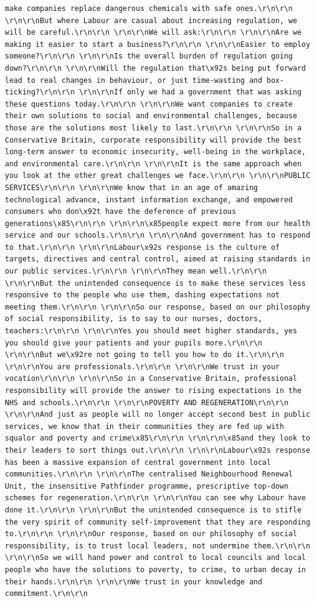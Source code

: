 \documentclass[
  letterpaper,
  DIV=11,
  numbers=noendperiod]{scrreprt}
\begin{document}
\begin{verbatim}
make companies replace dangerous chemicals with safe ones.\r\n\r\n \r\n\r\nBut where Labour are casual about increasing regulation, we will be careful.\r\n\r\n \r\n\r\nWe will ask:\r\n\r\n \r\n\r\nAre we making it easier to start a business?\r\n\r\n \r\n\r\nEasier to employ someone?\r\n\r\n \r\n\r\nIs the overall burden of regulation going down?\r\n\r\n \r\n\r\nWill the regulation that\x92s being put forward lead to real changes in behaviour, or just time-wasting and box-ticking?\r\n\r\n \r\n\r\nIf only we had a government that was asking these questions today.\r\n\r\n \r\n\r\nWe want companies to create their own solutions to social and environmental challenges, because those are the solutions most likely to last.\r\n\r\n \r\n\r\nSo in a Conservative Britain, corporate responsibility will provide the best long-term answer to economic insecurity, well-being in the workplace, and environmental care.\r\n\r\n \r\n\r\nIt is the same approach when you look at the other great challenges we face.\r\n\r\n \r\n\r\nPUBLIC SERVICES\r\n\r\n \r\n\r\nWe know that in an age of amazing technological advance, instant information exchange, and empowered consumers who don\x92t have the deference of previous generations\x85\r\n\r\n \r\n\r\n\x85people expect more from our health service and our schools.\r\n\r\n \r\n\r\nAnd government has to respond to that.\r\n\r\n \r\n\r\nLabour\x92s response is the culture of targets, directives and central control, aimed at raising standards in our public services.\r\n\r\n \r\n\r\nThey mean well.\r\n\r\n \r\n\r\nBut the unintended consequence is to make these services less responsive to the people who use them, dashing expectations not meeting them.\r\n\r\n \r\n\r\nSo our response, based on our philosophy of social responsibility, is to say to our nurses, doctors, teachers:\r\n\r\n \r\n\r\nYes you should meet higher standards, yes you should give your patients and your pupils more.\r\n\r\n \r\n\r\nBut we\x92re not going to tell you how to do it.\r\n\r\n \r\n\r\nYou are professionals.\r\n\r\n \r\n\r\nWe trust in your vocation\r\n\r\n \r\n\r\nSo in a Conservative Britain, professional responsibility will provide the answer to rising expectations in the NHS and schools.\r\n\r\n \r\n\r\nPOVERTY AND REGENERATION\r\n\r\n \r\n\r\nAnd just as people will no longer accept second best in public services, we know that in their communities they are fed up with squalor and poverty and crime\x85\r\n\r\n \r\n\r\n\x85and they look to their leaders to sort things out.\r\n\r\n \r\n\r\nLabour\x92s response has been a massive expansion of central government into local communities.\r\n\r\n \r\n\r\nThe centralised Neighbourhood Renewal Unit, the insensitive Pathfinder programme, prescriptive top-down schemes for regeneration.\r\n\r\n \r\n\r\nYou can see why Labour have done it.\r\n\r\n \r\n\r\nBut the unintended consequence is to stifle the very spirit of community self-improvement that they are responding to.\r\n\r\n \r\n\r\nOur response, based on our philosophy of social responsibility, is to trust local leaders, not undermine them.\r\n\r\n \r\n\r\nSo we will hand power and control to local councils and local people who have the solutions to poverty, to crime, to urban decay in their hands.\r\n\r\n \r\n\r\nWe trust in your knowledge and commitment.\r\n\r\n 
\end{verbatim}
\end{document}
